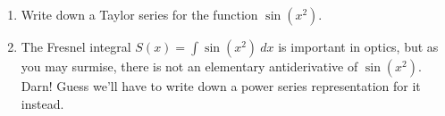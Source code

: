 \begin{enumerate}[leftmargin=15pt]
	\item Write down a Taylor series for the function $\sin(x^2)$.

	\vfill

	\item The Fresnel integral $S(x) = \int \sin(x^2)\ dx$ is important in optics, but as you may surmise, there is not an elementary antiderivative of $\sin(x^2)$. Darn! Guess we'll have to write down a power series representation for it instead.

	\vfill

\end{enumerate}

